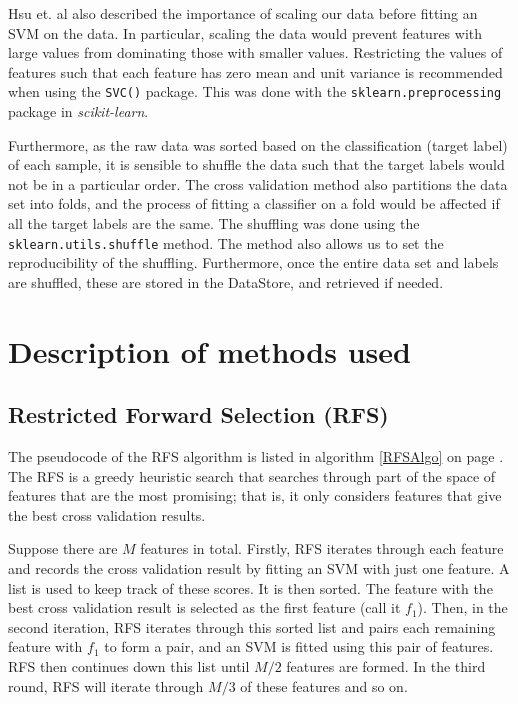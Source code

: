 \documentclass[12pt, twoside, a4paper]{report}
\begin{document}
Hsu et. al also described the importance of scaling our data before fitting an SVM on the data. In particular, scaling the data would prevent features with large values from dominating those with smaller values. Restricting the values of features such that each feature has zero mean and unit variance is recommended when using the \texttt{SVC()} package. This was done with the \texttt{sklearn.preprocessing} package in \textit{scikit-learn}.

Furthermore, as the raw data was sorted based on the classification (target label) of each sample, it is sensible to shuffle the data such that the target labels would not be in a particular order. The cross validation method also partitions the data set into folds, and the process of fitting a classifier on a fold would be affected if all the target labels are the same. The shuffling was done using the \texttt{sklearn.utils.shuffle} method. The method also allows us to set the reproducibility of the shuffling. Furthermore, once the entire data set and labels are shuffled, these are stored in the DataStore, and retrieved if needed.

\chapter{Description of methods used}

\section{Restricted Forward Selection (RFS)} \label{body:rfs}


The pseudocode of the RFS algorithm \cite{deng1998omega} is listed in algorithm \ref{RFSAlgo} on page \pageref{RFSAlgo}. The RFS is a greedy heuristic search that searches through part of the space of features that are the most promising; that is, it only considers features that give the best cross validation results.

Suppose there are $M$ features in total. Firstly, RFS iterates through each feature and records the cross validation result by fitting an SVM with just one feature. A list is used to keep track of these scores. It is then sorted. The feature with the best cross validation result is selected as the first feature (call it $f_1$). Then, in the second iteration, RFS iterates through this sorted list and pairs each remaining feature with $f_1$ to form a pair, and an SVM is fitted using this pair of features. RFS then continues down this list until $M/2$ features are formed. In the third round, RFS will iterate through $M/3$ of these features and so on.
\end{document}
